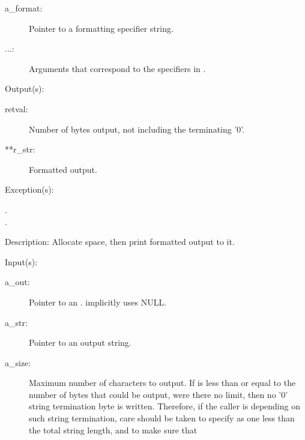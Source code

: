 \begin{capi}
\begin{capilist}
\begin{description}
		\item[a\_format: ]
			Pointer to a formatting specifier string.
		\item[...: ]
			Arguments that correspond to the specifiers in
			.
		\end{description}
	\item[Output(s): ]
		\begin{description}\item[]
		\item[retval: ]
			Number of bytes output, not including the terminating
			'{\bs}0'.
		\item[**r\_str: ]
			Formatted output.
		\end{description}
	\item[Exception(s): ]
		\begin{description}\item[]
		\item[.]
		\item[.]
		\end{description}
	\item[Description: ]
		Allocate space, then print formatted output to it.
	\end{capilist}
\label{out_put_sn}
\label{_cw_out_put_sn}
	\begin{capilist}
	\item[Input(s): ]
		\begin{description}\item[]
		\item[a\_out: ]
			Pointer to an .
			 implicitly uses NULL.
		\item[a\_str: ]
			Pointer to an output string.
		\item[a\_size: ]
			Maximum number of characters to output.  If
			 is less than or equal to the number of
			bytes that could be output, were there no limit, then no
			'{\bs}0' string termination byte is written.  Therefore,
			if the caller is depending on such string termination,
			care should be taken to specify  as one
			less than the total string length, and to make sure that

\end{description}
\end{capilist}
\end{capi}
